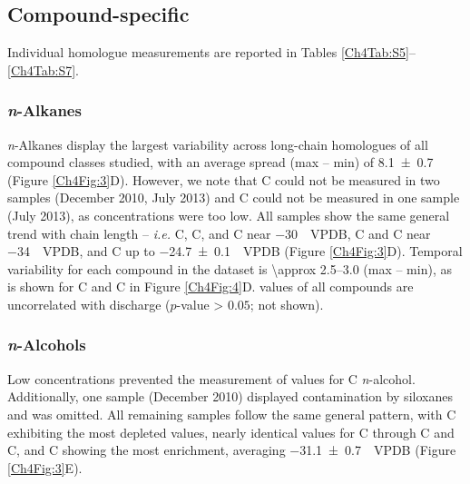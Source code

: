 \subsection{Compound-specific }

Individual homologue  measurements are reported in Tables \ref{Ch4Tab:S5}--\ref{Ch4Tab:S7}.

\subsubsection{\textit{n}-Alkanes}

\textit{n}-Alkanes display the largest  variability across long-chain homologues of all compound classes studied, with an average spread (max -- min) of \SI{8.1 \pm 0.7}{\permil} (Figure \ref{Ch4Fig:3}D). However, we note that C could not be measured in two samples (December 2010, July 2013) and C could not be measured in one sample (July 2013), as concentrations were too low. All samples show the same general trend with chain length -- \textit{i.e.} C, C, and C near \SI{-30}{\permil.VPDB}, C and C near \SI{-34}{\permil.VPDB}, and C up to \SI{-24.7 \pm 0.1}{\permil.VPDB} (Figure \ref{Ch4Fig:3}D). Temporal variability for each compound in the dataset is \SIrange{\approx 2.5}{3.0}{\permil} (max -- min), as is shown for C and C in Figure \ref{Ch4Fig:4}D.  values of all compounds are uncorrelated with discharge ($p$-value > $0.05$; not shown).

\subsubsection{\textit{n}-Alcohols}

Low concentrations prevented the measurement of  values for C \textit{n}-alcohol. Additionally, one sample (December 2010) displayed contamination by siloxanes and was omitted. All remaining samples follow the same general pattern, with C exhibiting the most depleted values, nearly identical values for C through C and C, and C showing the most enrichment, averaging \SI{-31.1 \pm 0.7}{\permil.VPDB} (Figure \ref{Ch4Fig:3}E).


